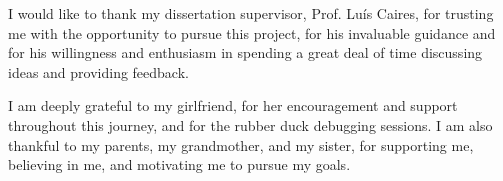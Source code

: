 
I would like to thank my dissertation supervisor, Prof. Luís Caires, for trusting me with the opportunity to pursue this project, for his invaluable guidance and for his willingness and enthusiasm in spending a great deal of time discussing ideas and providing feedback.

I am deeply grateful to my girlfriend, for her encouragement and support throughout this journey, and for the rubber duck debugging sessions. I am also thankful to my parents, my grandmother, and my sister, for supporting me, believing in me, and motivating me to pursue my goals.
